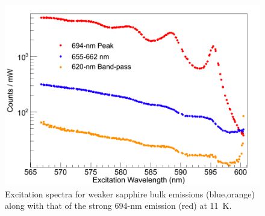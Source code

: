 \begin{figure} %
        \centering
                \includegraphics[width=.7\textwidth]{figures/Cr_broad.png}
                \caption{Excitation spectra for weaker sapphire bulk emissions (blue,orange) along with that of the strong 694-nm emission (red) at 11~K.}
        \label{fig:CrBroad}
\end{figure}

